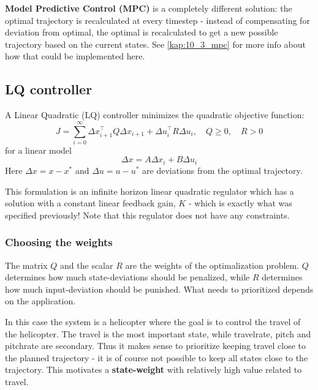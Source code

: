 \documentclass[../main.tex]{subfiles}
\begin{document}
\textbf{Model Predictive Control (MPC)} is a completely different solution: the optimal trajectory is recalculated at every timestep - instead of compensating for deviation from optimal, the optimal is recalculated to get a new possible trajectory based on the current states. See \cref{kap:10_3_mpc} for more info about how that could be implemented here.

\subsection{LQ controller} \label{kap:task_10_3_LQ_controller}
A Linear Quadratic (LQ) controller minimizes the quadratic objective function:
\begin{equation}
    J = \sum^\infty_{i=0} \Delta x_{i+1}^\top Q \Delta x_{i+1} + \Delta u_i^\top R \Delta u_i, \quad Q \ge0, \quad R > 0
\end{equation}
for a linear model
\begin{equation}\label{eq:lab3_lin_model}
	\Delta x=A\Delta x_i + B \Delta u_i
\end{equation}
Here $ \Delta x = x - x^*$ and $\Delta u = u - u^*$ are deviations from the optimal trajectory.

This formulation is an infinite horizon linear quadratic regulator which has a solution with a constant linear feedback gain, $K$ - which is exactly what was specified previously! Note that this regulator does not have any constraints.

\subsubsection{Choosing the weights}
The matrix $Q$ and the scalar $R$ are the weights of the optimalization problem. $Q$ determines how much state-deviations should be penalized, while $R$ determines how much input-deviation should be punished. What needs to prioritized depends on the application.

In this case the system is a helicopter where the goal is to control the travel of the helicopter. The travel is the most important state, while travelrate, pitch and pitchrate are secondary. Thus it makes sense to prioritize keeping travel close to the planned trajectory - it is of course not possible to keep all states close to the trajectory. This motivates a \textbf{state-weight} with relatively high value related to travel.
\end{document}
